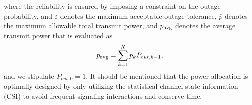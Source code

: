 \documentclass[conference]{IEEEtran}
\begin{document}
where the reliability is ensured by imposing a constraint on the outage probability, and $\varepsilon$ denotes the maximum acceptable outage tolerance, ${\bar p}$ denotes the maximum allowable total transmit power, and $p_{\rm avg}$ denotes the average transmit power that is evaluated as
\begin{equation}
    p_{\rm avg} = \sum\limits_{k = 1}^K {{p_k}{P_{out,k - 1}}},
\end{equation}
and we stipulate $P_{out,0} = 1$. It should be mentioned that the power allocation is optimally designed by only utilizing the statistical channel state information (CSI) to avoid frequent signaling interactions and conserve time.


\end{document}

